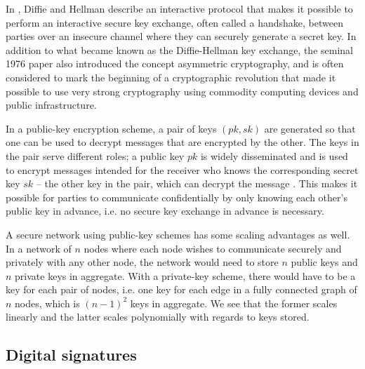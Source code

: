 In \cite{diffie1976new}, Diffie and Hellman describe an interactive protocol that makes it possible to perform an interactive secure key exchange, often called a handshake, between parties over an insecure channel where they can securely generate a secret key. In addition to what became known as the Diffie-Hellman key exchange, the seminal 1976 paper also introduced the concept asymmetric cryptography, and is often considered to mark the beginning of a cryptographic revolution that made it possible to use very strong cryptography using commodity computing devices and public infrastructure. 

In a public-key encryption scheme, a pair of keys $(pk, sk)$ are generated so that one can be used to decrypt messages that are encrypted by the other. The keys in the pair serve different roles; a public key $pk$ is widely disseminated and is used to encrypt messages intended for the receiver who knows the corresponding secret key $sk$ – the other key in the pair, which can decrypt the message \cite[p.~370]{lindell2014introduction}. This makes it possible for parties to communicate confidentially by only knowing each other's public key in advance, i.e. no secure key exchange in advance is necessary. 

A secure network using public-key schemes has some scaling advantages as well. In a network of $n$ nodes where each node wishes to communicate securely and privately with any other node, the network would need to store $n$ public keys and $n$ private keys in aggregate. With a private-key scheme, there would have to be a key for each pair of nodes, i.e. one key for each edge in a fully connected graph of $n$ nodes, which is $(n-1)^2$ keys in aggregate. We see that the former scales linearly and the latter scales polynomially with regards to keys stored. 

\subsection{Digital signatures}

